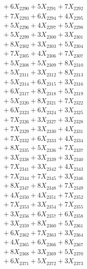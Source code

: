 \documentclass[a4paper,10pt]{article}
\begin{document}
{\begin{align}
&\;  + 6 X_{2290} + 5 X_{2291} + 7 X_{2292} \\[0.3ex]
&\;  + 7 X_{2293} + 6 X_{2294} + 4 X_{2295} \\[0.3ex]
&\;  + 5 X_{2296} + 4 X_{2297} + 5 X_{2298} \\[0.3ex]
&\;  + 5 X_{2299} + 3 X_{2300} + 3 X_{2301} \\[0.3ex]
&\;  + 8 X_{2302} + 3 X_{2303} + 5 X_{2304} \\[0.3ex]
&\;  + 7 X_{2305} + 4 X_{2306} + 7 X_{2307} \\[0.3ex]
&\;  + 5 X_{2308} + 5 X_{2309} + 8 X_{2310} \\[0.3ex]
&\;  + 5 X_{2311} + 3 X_{2312} + 8 X_{2313} \\[0.3ex]
&\;  + 5 X_{2314} + 6 X_{2315} + 3 X_{2316} \\[0.3ex]
&\;  + 6 X_{2317} + 8 X_{2318} + 5 X_{2319} \\[0.5ex]\allowbreak
&\;  + 5 X_{2320} + 8 X_{2321} + 7 X_{2322} \\[0.3ex]
&\;  + 6 X_{2323} + 6 X_{2324} + 3 X_{2325} \\[0.3ex]
&\;  + 7 X_{2326} + 3 X_{2327} + 3 X_{2328} \\[0.3ex]
&\;  + 7 X_{2329} + 3 X_{2330} + 4 X_{2331} \\[0.3ex]
&\;  + 7 X_{2332} + 6 X_{2333} + 4 X_{2334} \\[0.3ex]
&\;  + 8 X_{2335} + 5 X_{2336} + 7 X_{2337} \\[0.3ex]
&\;  + 3 X_{2338} + 3 X_{2339} + 3 X_{2340} \\[0.3ex]
&\;  + 7 X_{2341} + 3 X_{2342} + 4 X_{2343} \\[0.3ex]
&\;  + 7 X_{2344} + 7 X_{2345} + 3 X_{2346} \\[0.3ex]
&\;  + 8 X_{2347} + 8 X_{2348} + 7 X_{2349} \\[0.5ex]\allowbreak
&\;  + 4 X_{2350} + 4 X_{2351} + 7 X_{2352} \\[0.3ex]
&\;  + 7 X_{2353} + 3 X_{2354} + 7 X_{2355} \\[0.3ex]
&\;  + 3 X_{2356} + 6 X_{2357} + 6 X_{2358} \\[0.3ex]
&\;  + 3 X_{2359} + 8 X_{2360} + 5 X_{2361} \\[0.3ex]
&\;  + 6 X_{2362} + 7 X_{2363} + 3 X_{2364} \\[0.3ex]
&\;  + 4 X_{2365} + 6 X_{2366} + 8 X_{2367} \\[0.3ex]
&\;  + 8 X_{2368} + 3 X_{2369} + 5 X_{2370} \\[0.3ex]
&\;  + 6 X_{2371} + 5 X_{2372} + 3 X_{2373} \\[0.3ex]

\end{align}}
\end{document}
